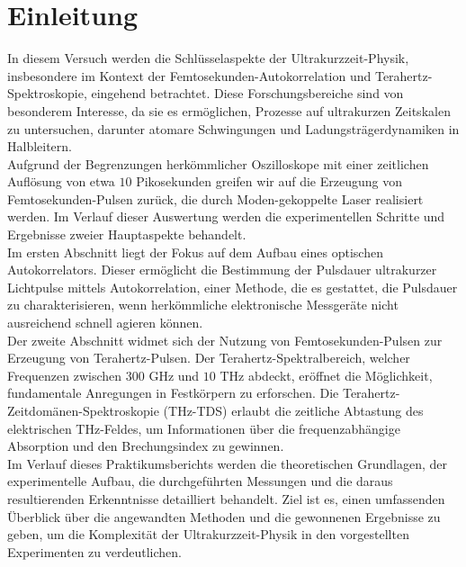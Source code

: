 \section{\label{sec:einleitung}Einleitung}
In diesem Versuch werden die Schlüsselaspekte der Ultrakurzzeit-Physik, 
insbesondere im Kontext der Femtosekunden-Autokorrelation und Terahertz-Spektroskopie, 
eingehend betrachtet. 
Diese Forschungsbereiche sind von besonderem Interesse, da sie es ermöglichen, 
Prozesse auf ultrakurzen Zeitskalen zu untersuchen, darunter atomare Schwingungen und 
Ladungsträgerdynamiken in Halbleitern. \\
Aufgrund der Begrenzungen herkömmlicher Oszilloskope mit einer zeitlichen Auflösung 
von etwa $10$ Pikosekunden greifen wir auf die Erzeugung von Femtosekunden-Pulsen zurück, 
die durch Moden-gekoppelte Laser realisiert werden. 
Im Verlauf dieser Auswertung werden die experimentellen Schritte und Ergebnisse zweier Hauptaspekte behandelt. \\
Im ersten Abschnitt liegt der Fokus auf dem Aufbau eines optischen Autokorrelators. 
Dieser ermöglicht die Bestimmung der Pulsdauer ultrakurzer Lichtpulse mittels Autokorrelation, 
einer Methode, die es gestattet, die Pulsdauer zu charakterisieren, wenn herkömmliche elektronische 
Messgeräte nicht ausreichend schnell agieren können. \\
Der zweite Abschnitt widmet sich der Nutzung von Femtosekunden-Pulsen zur Erzeugung von Terahertz-Pulsen. 
Der Terahertz-Spektralbereich, welcher Frequenzen zwischen $300$ GHz und $10$ THz abdeckt, 
eröffnet die Möglichkeit, fundamentale Anregungen in Festkörpern zu erforschen. 
Die Terahertz-Zeitdomänen-Spektroskopie (THz-TDS) erlaubt die zeitliche Abtastung des elektrischen 
THz-Feldes, um Informationen über die frequenzabhängige Absorption und den Brechungsindex zu gewinnen. \\
Im Verlauf dieses Praktikumsberichts werden die theoretischen Grundlagen, der experimentelle Aufbau, 
die durchgeführten Messungen und die daraus resultierenden Erkenntnisse detailliert behandelt. 
Ziel ist es, einen umfassenden Überblick über die angewandten Methoden und die gewonnenen Ergebnisse zu geben, 
um die Komplexität der Ultrakurzzeit-Physik in den vorgestellten Experimenten zu verdeutlichen.